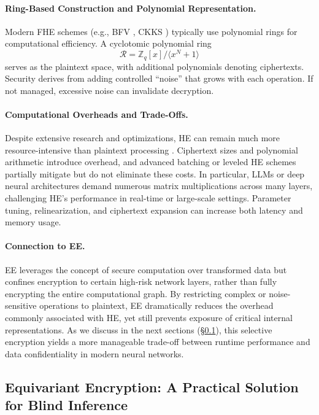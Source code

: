 \documentclass[10pt]{article}
\begin{document}
\paragraph{Ring-Based Construction and Polynomial Representation.}
Modern FHE schemes (e.g., BFV \cite{fan2012somewhat}, CKKS \cite{cheon2017homomorphic}) typically use polynomial rings for computational efficiency. A cyclotomic polynomial ring
\[
\mathcal{R} = \mathbb{Z}_q[x]\big/\langle x^N + 1 \rangle
\]
serves as the plaintext space, with additional polynomials denoting ciphertexts. Security derives from adding controlled ``noise'' that grows with each operation. If not managed, excessive noise can invalidate decryption.

\paragraph{Computational Overheads and Trade-Offs.}
Despite extensive research and optimizations, HE can remain much more resource-intensive than plaintext processing \cite{albrecht2019homomorphic}. 
Ciphertext sizes and polynomial arithmetic introduce overhead, and advanced batching or leveled HE schemes \cite{halevi2014alg} partially mitigate but do not eliminate these costs. 
In particular, LLMs or deep neural architectures demand numerous matrix multiplications across many layers, challenging HE’s performance in real-time or large-scale settings. Parameter tuning, relinearization, and ciphertext expansion can increase both latency and memory usage.

\paragraph{Connection to EE.}
EE leverages the concept of secure computation over transformed data but confines encryption to certain high-risk network layers, rather than fully encrypting the entire computational graph. 
By restricting complex or noise-sensitive operations to plaintext, EE dramatically reduces the overhead commonly associated with HE, yet still prevents exposure of critical internal representations. 
As we discuss in the next sections (\S\ref{sec:ee_general}), this selective encryption yields a more manageable trade-off between runtime performance and data confidentiality in modern neural networks.





\subsection{Equivariant Encryption: A Practical Solution for Blind Inference}
\label{sec:ee_general}
\end{document}
